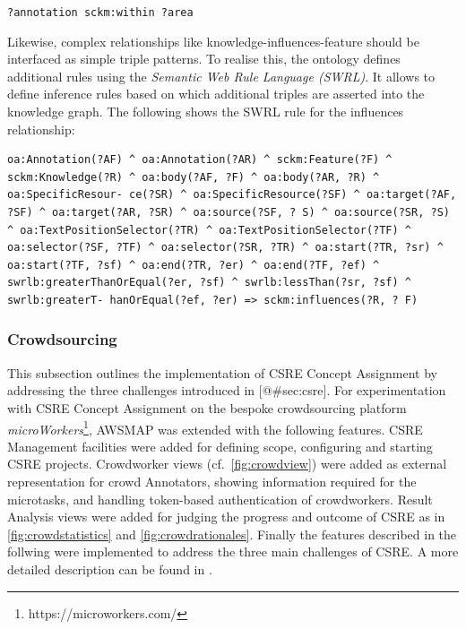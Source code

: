 \texttt{?annotation\ sckm:within\ ?area}

Likewise, complex relationships like knowledge-influences-feature should be interfaced as simple triple patterns.
To realise this, the ontology defines additional rules using the \emph{Semantic Web Rule Language (SWRL)}.
It allows to define inference rules based on which additional triples are asserted into the knowledge graph.
The following shows the SWRL rule for the influences relationship:

\hypertarget{lst:swrl}{%
\label{lst:swrl}}%
\begin{verbatim}
oa:Annotation(?AF) ^ oa:Annotation(?AR) ^ sckm:Feature(?F) ^ sckm:Knowledge(?R) ^ oa:body(?AF, ?F) ^ oa:body(?AR, ?R) ^ oa:SpecificResour- ce(?SR) ^ oa:SpecificResource(?SF) ^ oa:target(?AF, ?SF) ^ oa:target(?AR, ?SR) ^ oa:source(?SF, ? S) ^ oa:source(?SR, ?S) ^ oa:TextPositionSelector(?TR) ^ oa:TextPositionSelector(?TF) ^ oa:selector(?SF, ?TF) ^ oa:selector(?SR, ?TR) ^ oa:start(?TR, ?sr) ^ oa:start(?TF, ?sf) ^ oa:end(?TR, ?er) ^ oa:end(?TF, ?ef) ^ swrlb:greaterThanOrEqual(?er, ?sf) ^ swrlb:lessThan(?sr, ?sf) ^ swrlb:greaterT- hanOrEqual(?ef, ?er) => sckm:influences(?R, ? F)
\end{verbatim}

\hypertarget{sec:csre.impl}{%
\subsubsection{Crowdsourcing}\label{sec:csre.impl}}

This subsection outlines the implementation of CSRE Concept Assignment by addressing the three challenges introduced in {[}@\#sec:csre{]}.
For experimentation with CSRE Concept Assignment on the bespoke crowdsourcing platform \emph{microWorkers}\footnote{https://microworkers.com/}, AWSMAP was extended with the following features.
CSRE Management facilities were added for defining scope, configuring and starting CSRE projects.
Crowdworker views (cf.~\cref{fig:crowdview}) were added as external representation for crowd Annotators, showing information required for the microtasks, and handling token-based authentication of crowdworkers.
Result Analysis views were added for judging the progress and outcome of CSRE as in \cref{fig:crowdstatistics} and \cref{fig:crowdrationales}.
Finally the features described in the follwing were implemented to address the three main challenges of CSRE.
A more detailed description can be found in \autocite{Heil2018CSRE,Heil2019CSRECCIS}.

